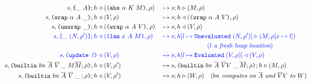 \begin{figure}
\begin{subfigure}[c]{\linewidth}
{\begin{alignat*}{2}
      s,\texttt{\{}\_ ~ A\texttt{\}};h &\mathrel\triangleleft (\texttt{(} \texttt{abs} ~ \alpha ~ K ~ M \texttt{)},\rho) 
                                                    &{}\mapsto{}& s;h \mathrel\triangleright (M,\rho) \\
      s,\texttt{(} \texttt{wrap} ~ \alpha ~ A ~ \_ \texttt{)};h &\mathrel\triangleleft (V, \rho) &{}\mapsto{}& s;h \mathrel\triangleleft (\texttt{(} \texttt{wrap} ~ \alpha ~ A ~ V \texttt{)}, \rho)\\
      s,\texttt{(} \texttt{unwrap} ~ \_ \texttt{)}{};h &\mathrel\triangleleft (\texttt{(} \texttt{wrap} ~ \alpha ~ A ~ V \texttt{)}, \rho) 
                                                    &{}\mapsto{}& s;h \mathrel\triangleleft (V,\rho)\\
      \textcolor{blue}{s,\texttt{[} \_ ~ (N,\rho^{\prime}) \texttt{]};h} & \color{blue}\mathrel\triangleleft (\texttt{(} \texttt{lam} ~ x ~ A ~ M \texttt{)}, \rho) 
                                                    &{}\color{blue}\mapsto{}& \textcolor{blue}{s;h[l\mapsto \texttt{Unevaluated}\;(N,\rho^{\prime})] \mathrel\triangleright (M, \rho[x \mapsto l])}\\
      & & & \hspace{2cm}\textcolor{blue}{(\textit{$l$ a fresh heap location})}\\
      \textcolor{blue}{s, \texttt{(update\ $l$)}}  & \color{blue}\mathrel\triangleleft (V, \rho)   &{}\color{blue}\mapsto{}& \textcolor{blue}{s;h[l\mapsto \texttt{Evaluated}\;(V, \rho)] \mathrel\triangleleft (V,\rho)}\\
      s, \texttt{(} \texttt{builtin} ~ bn ~ \overline{A} ~ \overline{V}\; \_\; M \overline{M}; \rho \texttt{)}{}; h &\mathrel\triangleleft (V , \rho^{\prime})
                                                    &{}\mapsto{}& s, \texttt{(} \texttt{builtin} ~ bn ~ \overline{A} ~ \overline{V} V\; \_\; \overline{M}; \rho \texttt{)};h \mathrel\triangleright (M, \rho)\\
      s,\texttt{(} \texttt{builtin} ~ bn ~ \overline{A} ~ \overline{V}\; \_\; ; \rho \texttt{)}; h &\mathrel\triangleleft (V, \rho^{\prime}) 
                                                    &{}\mapsto{}& s;h \mathrel\triangleright (W, \rho) \quad 
                                                    (\textit{$bn$ computes on $\overline{A}$ and $\overline{V}V$ to $W$})\\
\end{alignat*}
}
\end{subfigure}

\end{figure}


